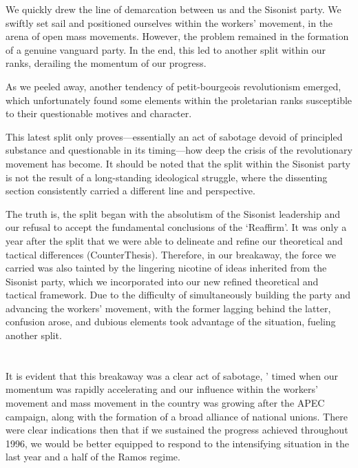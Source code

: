 We quickly drew the line of demarcation between us and the Sisonist party. 
We swiftly set sail and positioned ourselves within the workers' movement, 
in the arena of open mass movements. However, the problem remained 
in the formation of a genuine vanguard party. In the end, 
this led to another split within our ranks, derailing the momentum 
of our progress.

As we peeled away, another tendency of petit-bourgeois revolutionism emerged, 
which unfortunately found some elements within the proletarian ranks 
susceptible to their questionable motives and character.

This latest split only proves---essentially an act of sabotage 
devoid of principled substance and questionable in its timing---how 
deep the crisis of the revolutionary movement has become. 
It should be noted that the split within the Sisonist party 
is not the result of a long-standing ideological struggle, 
where the dissenting section consistently carried 
a different line and perspective.

The truth is, the split began with the absolutism 
of the Sisonist leadership and our refusal to accept 
the fundamental conclusions of the `Reaffirm'. 
It was only a year after the split that we were able to delineate 
and refine our theoretical and tactical differences (CounterThesis). 
Therefore, in our breakaway, the force we carried was also tainted 
by the lingering nicotine of ideas inherited from the Sisonist party, 
which we incorporated into our new refined theoretical and tactical framework. 
Due to the difficulty of simultaneously building the party and advancing 
the workers' movement, with the former lagging behind the latter, 
confusion arose, and dubious elements took advantage of the situation, 
fueling another split.


\section{}
It is evident that this breakaway was a clear act of sabotage, '
timed when our momentum was rapidly accelerating and our influence 
within the workers' movement and mass movement in the country was growing 
after the APEC campaign, along with the formation of a broad alliance of 
national unions. There were clear indications then that if we sustained 
the progress achieved throughout 1996, we would be better equipped to respond 
to the intensifying situation in the last year and a half of the Ramos regime.

